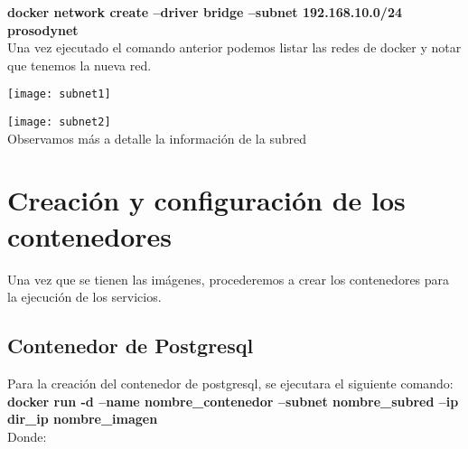 \documentclass[10pt,letterpaper]{article}
\begin{document}
\textbf{docker network create --driver bridge --subnet 192.168.10.0/24 prosodynet}\\

Una vez ejecutado el comando anterior podemos listar las redes de docker y notar que tenemos la nueva red.

\begin{center}
\texttt{[image: subnet1]}
\end{center}

\begin{center}
\texttt{[image: subnet2]}\\
Observamos más a detalle la información de la subred
\end{center}

\section{Creación y configuración de los contenedores}
Una vez que se tienen las imágenes, procederemos a crear los contenedores para la ejecución de los servicios.

\subsection{Contenedor de Postgresql}

Para la creación del contenedor de postgresql, se ejecutara el siguiente comando:\\

\textbf{docker run -d --name nombre\_contenedor --subnet nombre\_subred --ip dir\_ip nombre\_imagen}\\

Donde:
\end{document}
